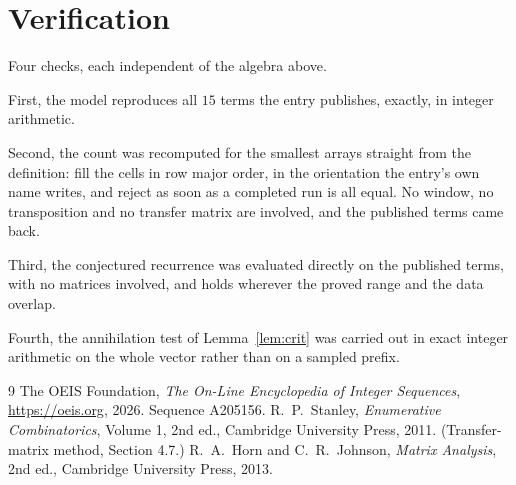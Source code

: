 \documentclass[11pt,a4paper]{article}
\theoremstyle{plain}
\theoremstyle{definition}
\begin{document}
\section{Verification}

Four checks, each independent of the algebra above.

First, the model reproduces all $15$ terms the entry publishes, exactly, in integer
arithmetic.

Second, the count was recomputed for the smallest arrays straight from the definition: fill the
cells in row major order, in the orientation the entry's own name writes, and reject as soon as
a completed run is all equal. No window, no transposition and no transfer matrix are involved, and
the published terms came back.

Third, the conjectured recurrence was evaluated directly on the published terms, with no
matrices involved, and holds wherever the proved range and the data overlap.

Fourth, the annihilation test of Lemma~\ref{lem:crit} was carried out in exact integer
arithmetic on the whole vector rather than on a sampled prefix.

\begin{thebibliography}{9}
 The OEIS Foundation, \emph{The On-Line Encyclopedia of Integer
Sequences}, \url{https://oeis.org}, 2026. Sequence A205156.
 R.~P.~Stanley, \emph{Enumerative Combinatorics}, Volume 1, 2nd ed.,
Cambridge University Press, 2011. (Transfer-matrix method, Section 4.7.)
 R.~A.~Horn and C.~R.~Johnson, \emph{Matrix Analysis}, 2nd ed., Cambridge
University Press, 2013.
\end{thebibliography}
\end{document}

